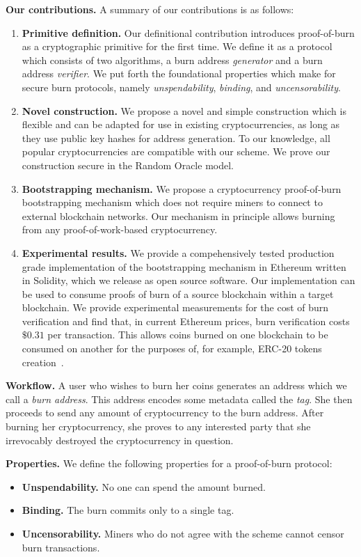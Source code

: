 \noindent
\textbf{Our contributions.}
A summary of our contributions is as follows:
\begin{enumerate}[wide, labelwidth=!, labelindent=0pt, label=(\roman*)]
    \item \textbf{Primitive definition.} Our definitional contribution introduces proof-of-burn as a cryptographic primitive for the first time. We
    define it as a protocol which consists of two algorithms, a burn address \emph{generator} and a burn address \emph{verifier}. We put forth the foundational properties which make for secure burn protocols, namely \emph{unspendability}, \emph{binding}, and \emph{uncensorability}.
    \item \textbf{Novel construction.} We propose a novel and simple construction which is flexible and can be adapted for use in existing cryptocurrencies, as long as they use public key hashes for address generation. To our knowledge, all popular cryptocurrencies are
    compatible with our scheme. We prove our construction secure in the Random Oracle model.
    \item \textbf{Bootstrapping mechanism.} We propose a cryptocurrency proof-of-burn bootstrapping mechanism which does not require miners to connect to external blockchain networks. Our mechanism in principle allows burning from any proof-of-work-based cryptocurrency.
    \item \textbf{Experimental results.} We provide a compehensively tested production grade implementation of the bootstrapping mechanism in Ethereum
    written in Solidity, which we release as open source software. Our implementation can be used to consume proofs of burn of a source blockchain
    within a target blockchain. We provide experimental measurements for the cost of burn verification and find that, in current Ethereum prices,
    burn verification costs $\$0.31$ per transaction.
    This allows coins burned on one blockchain to be consumed on another for the purposes of, for example, ERC-20 tokens creation~\cite{erc20}.
\end{enumerate}

\noindent
\textbf{Workflow.}
A user who wishes to burn her coins generates an address which we call a \emph{burn address}.
This address encodes some metadata called the \emph{tag}. She then proceeds to send any amount of cryptocurrency to the burn address. After burning her cryptocurrency, she proves to any interested party that she irrevocably destroyed the cryptocurrency in question.

\noindent
\textbf{Properties.}
We define the following properties for a proof-of-burn protocol:
\begin{itemize}
    \item \textbf{Unspendability.} No one can spend the amount burned.
    \item \textbf{Binding.} The burn commits only to a single tag.
    \item \textbf{Uncensorability.} Miners who do not agree with the scheme cannot censor burn transactions.
\end{itemize}

